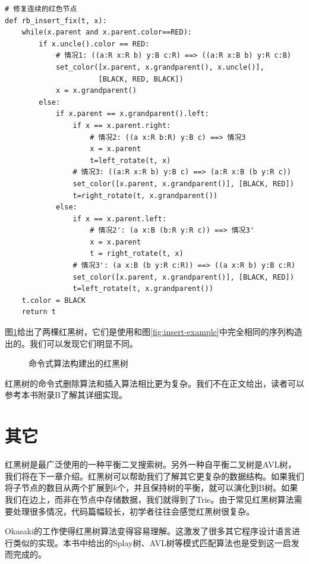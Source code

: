 \documentclass[b5paper]{ctexart}
\begin{document}
\lstset{language=Python}
\begin{lstlisting}
# 修复连续的红色节点
def rb_insert_fix(t, x):
    while(x.parent and x.parent.color==RED):
        if x.uncle().color == RED:
            # 情况1: ((a:R x:R b) y:B c:R) ==> ((a:R x:B b) y:R c:B)
            set_color([x.parent, x.grandparent(), x.uncle()],
                      [BLACK, RED, BLACK])
            x = x.grandparent()
        else:
            if x.parent == x.grandparent().left:
                if x == x.parent.right:
                    # 情况2: ((a x:R b:R) y:B c) ==> 情况3
                    x = x.parent
                    t=left_rotate(t, x)
                # 情况3: ((a:R x:R b) y:B c) ==> (a:R x:B (b y:R c))
                set_color([x.parent, x.grandparent()], [BLACK, RED])
                t=right_rotate(t, x.grandparent())
            else:
                if x == x.parent.left:
                    # 情况2': (a x:B (b:R y:R c)) ==> 情况3'
                    x = x.parent
                    t = right_rotate(t, x)
                # 情况3': (a x:B (b y:R c:R)) ==> ((a x:R b) y:B c:R)
                set_color([x.parent, x.grandparent()], [BLACK, RED])
                t=left_rotate(t, x.grandparent())
    t.color = BLACK
    return t
\end{lstlisting}

图\ref{fig:imperative-insert}给出了两棵红黑树，它们是使用和图\ref{fig:insert-example}中完全相同的序列构造出的。我们可以发现它们明显不同。

\begin{figure}[htbp]
   \centering
   \caption{命令式算法构建出的红黑树}
   \label{fig:imperative-insert}
\end{figure}

红黑树的命令式删除算法和插入算法相比更为复杂。我们不在正文给出，读者可以参考本书附录B了解其详细实现。

\section{其它}
红黑树是最广泛使用的一种平衡二叉搜索树。另外一种自平衡二叉树是AVL树，我们将在下一章介绍。红黑树可以帮助我们了解其它更复杂的数据结构。如果我们将子节点的数目从两个扩展到$k$个，并且保持树的平衡，就可以演化到B树。如果我们在边上，而非在节点中存储数据，我们就得到了Trie。由于常见红黑树算法需要处理很多情况，代码篇幅较长，初学者往往会感觉红黑树很复杂。

Okasaki的工作使得红黑树算法变得容易理解。这激发了很多其它程序设计语言进行类似的实现\cite{rosetta}。本书中给出的Splay树、AVL树等模式匹配算法也是受到这一启发而完成的。
\end{document}
